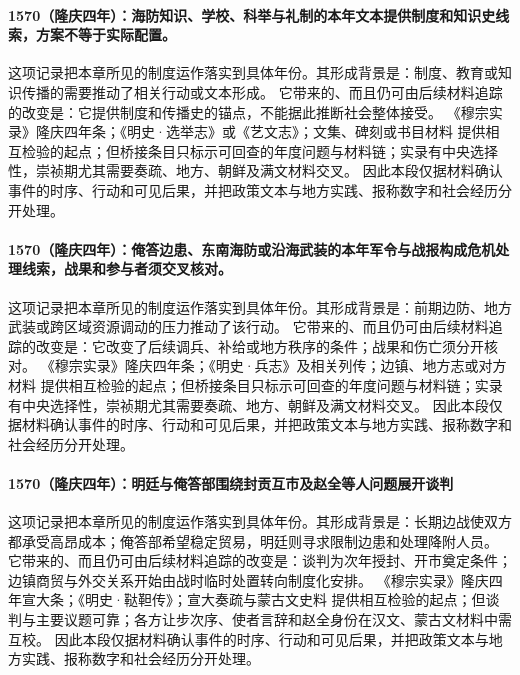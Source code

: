 \paragraph{1570（隆庆四年）：海防知识、学校、科举与礼制的本年文本提供制度和知识史线索，方案不等于实际配置。} 这项记录把本章所见的制度运作落实到具体年份。其形成背景是：制度、教育或知识传播的需要推动了相关行动或文本形成。 它带来的、而且仍可由后续材料追踪的改变是：它提供制度和传播史的锚点，不能据此推断社会整体接受。 《穆宗实录》隆庆四年条；《明史·选举志》或《艺文志》；文集、碑刻或书目材料 提供相互检验的起点；但桥接条目只标示可回查的年度问题与材料链；实录有中央选择性，崇祯期尤其需要奏疏、地方、朝鲜及满文材料交叉。 因此本段仅据材料确认事件的时序、行动和可见后果，并把政策文本与地方实践、报称数字和社会经历分开处理。

\paragraph{1570（隆庆四年）：俺答边患、东南海防或沿海武装的本年军令与战报构成危机处理线索，战果和参与者须交叉核对。} 这项记录把本章所见的制度运作落实到具体年份。其形成背景是：前期边防、地方武装或跨区域资源调动的压力推动了该行动。 它带来的、而且仍可由后续材料追踪的改变是：它改变了后续调兵、补给或地方秩序的条件；战果和伤亡须分开核对。 《穆宗实录》隆庆四年条；《明史·兵志》及相关列传；边镇、地方志或对方材料 提供相互检验的起点；但桥接条目只标示可回查的年度问题与材料链；实录有中央选择性，崇祯期尤其需要奏疏、地方、朝鲜及满文材料交叉。 因此本段仅据材料确认事件的时序、行动和可见后果，并把政策文本与地方实践、报称数字和社会经历分开处理。

\paragraph{1570（隆庆四年）：明廷与俺答部围绕封贡互市及赵全等人问题展开谈判} 这项记录把本章所见的制度运作落实到具体年份。其形成背景是：长期边战使双方都承受高昂成本；俺答部希望稳定贸易，明廷则寻求限制边患和处理降附人员。 它带来的、而且仍可由后续材料追踪的改变是：谈判为次年授封、开市奠定条件；边镇商贸与外交关系开始由战时临时处置转向制度化安排。 《穆宗实录》隆庆四年宣大条；《明史·鞑靼传》；宣大奏疏与蒙古文史料 提供相互检验的起点；但谈判与主要议题可靠；各方让步次序、使者言辞和赵全身份在汉文、蒙古文材料中需互校。 因此本段仅据材料确认事件的时序、行动和可见后果，并把政策文本与地方实践、报称数字和社会经历分开处理。

